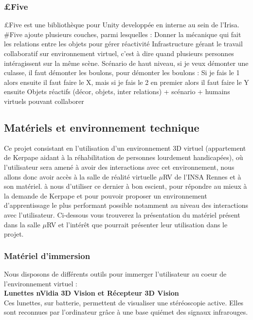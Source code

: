 	\subsubsection{{\pounds}Five}
		{\pounds}Five est une bibliothèque pour Unity developpée en interne au sein de l’Irisa. #Five ajoute plusieurs couches, parmi lesquelles : 
		Donner la mécanique qui fait les relations entre les objets pour gérer réactivité
		Infrastructure gérant le travail collaboratif sur environnement virtuel, c'est à dire quand plusieurs personnes intéragissent sur la même scène.
		Scénario de haut niveau, si je veux démonter une culasse, il faut démonter les boulons, pour démonter les boulons : Si je fais le 1 alors ensuite il faut faire le X, mais si je fais le 2 en premier alors il faut faire le Y ensuite
		Objets réactifs (décor, objets, inter relations) + scénario + humains virtuels pouvant collaborer


\subsection{Matériels et environnement technique}

Ce projet consistant en l'utilisation d'un environnement 3D virtuel (appartement de Kerpape aidant à la réhabilitation de personnes lourdement handicapées), où l'utilisateur sera amené à avoir des interactions avec cet environnement, nous allons donc avoir accès à la salle de réalité virtuelle $\mu$RV de l'INSA Rennes et à son matériel. à nous d'utiliser ce dernier à bon escient, pour répondre au mieux à la demande de Kerpape et pour pouvoir proposer un environnement d'apprentissage le plus performant possible notamment au niveau des interactions avec l'utilisateur. 
Ci-dessous vous trouverez la présentation du matériel présent dans la salle $\mu$RV et l'intérêt que pourrait présenter leur utilisation dans le projet.

\subsubsection{Matériel d'immersion}
Nous disposons de différents outils pour immerger l'utilisateur au coeur de l'environnement virtuel : 
\\

\textbf{Lunettes nVidia 3D Vision et Récepteur 3D Vision}
\\

Ces lunettes, sur batterie, permettent de visualiser une stéréoscopie active. Elles sont reconnues par l'ordinateur grâce à une base quiémet des signaux infrarouges.
\\

